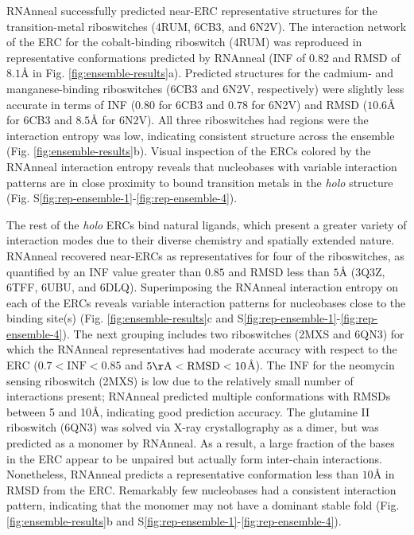 \documentclass[%
aip,
 amsmath,amssymb,
reprint,%
twocolumn,
]{revtex4-1}
\begin{document}
{RNAnneal successfully predicted near-ERC representative structures for the transition-metal riboswitches (4RUM\cite{Ramesh2014}, 6CB3\cite{Bachas2018}, and 6N2V\cite{Price2018}). The interaction network of the ERC for the cobalt-binding riboswitch (4RUM\cite{Ramesh2014}) was reproduced in representative conformations predicted by RNAnneal (INF of $0.82$ and RMSD of $8.1${\AA} in Fig. \ref{fig:ensemble-results}a). Predicted structures for the cadmium- and manganese-binding riboswitches (6CB3\cite{Bachas2018} and 6N2V\cite{Price2018}, respectively) were slightly less accurate in terms of INF ($0.80$ for 6CB3\cite{Bachas2018} and $0.78$ for 6N2V\cite{Price2018}) and RMSD ($10.6${\AA} for 6CB3\cite{Bachas2018} and $8.5${\AA} for 6N2V\cite{Price2018}). All three riboswitches had regions were the interaction entropy was low, indicating consistent structure across the ensemble (Fig. \ref{fig:ensemble-results}b). Visual inspection of the ERCs colored by the RNAnneal interaction entropy reveals that nucleobases with variable interaction patterns are in close proximity to bound transition metals in the {\it holo} structure (Fig. S\ref{fig:rep-ensemble-1}-\ref{fig:rep-ensemble-4}).

The rest of the {\it holo} ERCs bind natural ligands, which present a greater variety of interaction modes due to their diverse chemistry and spatially extended nature. RNAnneal recovered near-ERCs as representatives for four of the riboswitches, as quantified by an INF value greater than $0.85$ and RMSD less than $5${\AA} (3Q3Z\cite{Smith2010}, 6TFF\cite{Huang2020}, 6UBU\cite{Matyjasik2019}, and 6DLQ\cite{Peselis2018}). Superimposing the RNAnneal interaction entropy on each of the ERCs reveals variable interaction patterns for nucleobases close to the binding site(s) (Fig. \ref{fig:ensemble-results}c and S\ref{fig:rep-ensemble-1}-\ref{fig:rep-ensemble-4}). The next grouping includes two riboswitches (2MXS\cite{Schmidtke2015} and 6QN3\cite{Huang2019}) for which the RNAnneal representatives had moderate accuracy with respect to the ERC ($0.7<\mathrm{INF}<0.85$ and $5\mathrm{{\AA}}<\mathrm{RMSD}<10${\AA}). The INF for the neomycin sensing riboswitch (2MXS\cite{Schmidtke2015}) is low due to the relatively small number of interactions present; RNAnneal predicted multiple conformations with RMSDs between 5 and 10{\AA}, indicating good prediction accuracy. The glutamine II riboswitch (6QN3\cite{Huang2019}) was solved via X-ray crystallography as a dimer, but was predicted as a monomer by RNAnneal. As a result, a large fraction of the bases in the ERC appear to be unpaired but actually form inter-chain interactions. Nonetheless, RNAnneal predicts a representative conformation less than $10${\AA} in RMSD from the ERC. Remarkably few nucleobases had a consistent interaction pattern, indicating that the monomer may not have a dominant stable fold (Fig. \ref{fig:ensemble-results}b and S\ref{fig:rep-ensemble-1}-\ref{fig:rep-ensemble-4}). 


}
\end{document}
